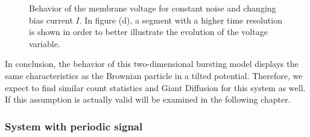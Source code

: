 \documentclass[12pt,a4paper]{article}
\begin{document}
\begin{figure}[H]
	\caption{Behavior of the membrane voltage for constant noise and changing bias current $I$. In figure (d), a segment with a higher time resolution is shown in order to better illustrate the evolution of the voltage variable.}
	\label{currentnoise} 
\end{figure}
In conclusion, the behavior of this two-dimensional bursting model displays the same characteristics as the Brownian particle in a tilted potential. Therefore, we expect to find similar count statistics and Giant Diffusion for this system as well. If this assumption is actually valid will be examined in the following chapter.
\subsubsection{System with periodic signal}
\end{document}
